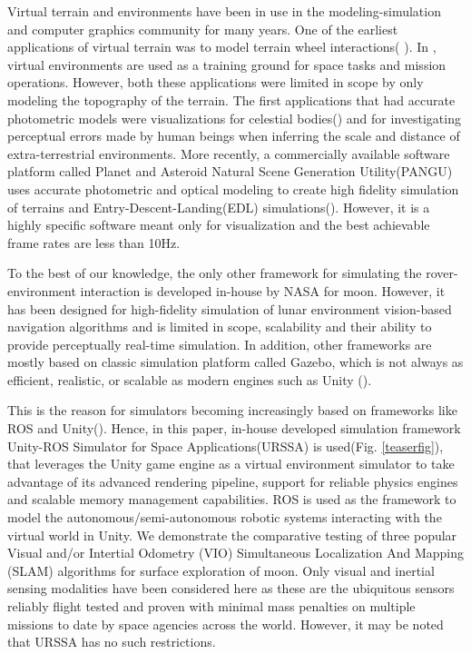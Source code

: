 \documentclass[a4paper, 10pt, conference]{ieeeconf}      %
\begin{document}
Virtual terrain and environments have been in use in the modeling-simulation and computer graphics community for many years. One of the earliest applications of virtual terrain was to model terrain wheel interactions( \cite{yang2007realistic,yang2008virtual,ding2008design,gao2012virtual}). In \cite{andreev2018creating}, virtual environments are used as a training ground for space tasks and mission operations. However, both these applications were limited in scope by only modeling the topography of the terrain. The first applications that had accurate photometric models were visualizations for celestial bodies(\cite{van2011investigation,wright2011preparing, jensen2001physically}) and for investigating perceptual errors made by human beings when inferring the scale and distance of extra-terrestrial environments\cite{oravetz2011slope}. More recently, a commercially available software platform called Planet and Asteroid Natural Scene Generation Utility(PANGU) uses accurate photometric and optical modeling  to create high fidelity simulation of terrains and Entry-Descent-Landing(EDL) simulations(\cite{dunstan2018pangu,martin2019planetary}). However, it is a highly specific software meant only for visualization and the best achievable frame rates are less than 10Hz. 

To the best of our knowledge, the only other framework for simulating the rover-environment interaction is developed in-house by NASA\cite{allan2019planetary} for moon. However, it has been designed for high-fidelity simulation of lunar environment vision-based navigation algorithms and is limited in scope, scalability and their ability to provide perceptually real-time simulation. In addition, other frameworks are mostly based on classic simulation platform called Gazebo\cite{koenig2004design}, which is not always as efficient, realistic, or scalable as modern engines such as Unity (\cite{engine2008unity, konrad2019simulation}). 

This is the reason for simulators becoming increasingly based on frameworks like ROS\cite{quigley2009ros} and Unity(\cite{babaians2018ros2unity3d,bischoffm_2019_06}). Hence, in this paper, in-house developed simulation framework Unity-ROS Simulator for Space Applications(URSSA)\cite{msm2020rss} is used(Fig. \ref{teaserfig}), that leverages the Unity game engine as a virtual environment simulator to take advantage of its advanced rendering pipeline, support for reliable physics engines and scalable memory management capabilities. ROS is used as the framework to model the autonomous/semi-autonomous robotic systems interacting with the virtual world in Unity. We demonstrate the comparative testing of three popular Visual and/or Intertial Odometry (VIO)\cite{roumeliotis2002augmenting} Simultaneous Localization And Mapping (SLAM)\cite{durrant1996localization} algorithms for surface exploration of moon. Only visual and inertial sensing modalities have been considered here as these are the ubiquitous sensors reliably flight tested and proven with minimal mass penalties on multiple missions to date by space agencies across the world. However, it may be noted that URSSA has no such restrictions.
\end{document}
